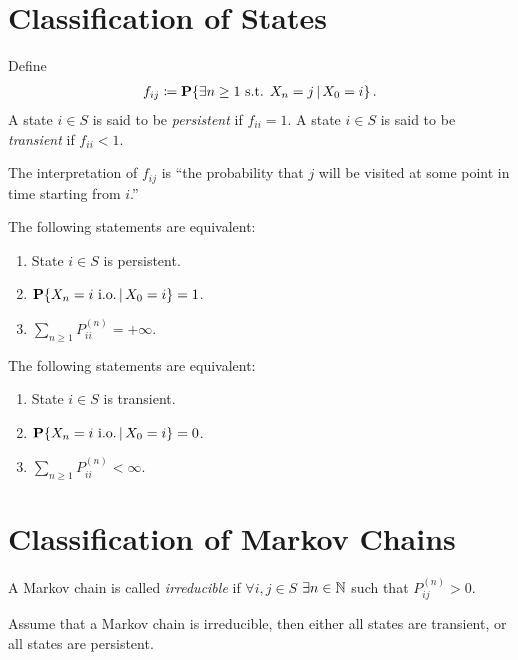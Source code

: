 \documentclass[a4paper,12pt]{article}
\begin{document}
\section{Classification of States}

\begin{definition}
	Define
	\begin{align*}
		f_{ij} \coloneqq
		\operatorname{\text{\upshape\textbf{P}}}\!\left\{\exists n\geq1 \text{ s.t. }X_{n}=j\,|\, X_{0}=i\right\}.
	\end{align*}
	A state $i\in S$ is said to be \emph{persistent} if $f_{ii}=1$.
	A state $i\in S$ is said to be \emph{transient} if $f_{ii}<1$.
\end{definition}

\begin{remark}
	The interpretation of $f_{ij}$ is ``the probability that $j$ will be visited at some point in time starting from $i$.''
\end{remark}

\begin{theorem}
	The following statements are equivalent:
	\begin{enumerate}[label=(\roman*)]
		\item State $i\in S$ is persistent.
		\item $\operatorname{\text{\upshape\textbf{P}}}\!\left\{X_{n}=i\text{ i.o.}\,|\, X_{0}=i\right\}=1$.
		\item $\sum_{n\geq1} P_{ii}^{(n)}=+\infty$.
	\end{enumerate}
	The following statements are equivalent:
	\begin{enumerate}[label=(\roman*)]
		\item State $i\in S$ is transient.
		\item $\operatorname{\text{\upshape\textbf{P}}}\!\left\{X_{n}=i\text{ i.o.}\,|\, X_{0}=i\right\}=0$.
		\item $\sum_{n\geq1} P_{ii}^{(n)}<\infty$.
	\end{enumerate}
\end{theorem}

\section{Classification of Markov Chains}

\begin{definition}[Irreducible]
	A Markov chain is called \emph{irreducible} if $\forall i,j\in S$ $\exists n\in\mathbb{N}$ such that
	$P_{ij}^{(n)}>0$.
\end{definition}

\begin{theorem}
	Assume that a Markov chain is irreducible,
	then either all states are transient,
	or all states are persistent.
\end{theorem}
\end{document}
